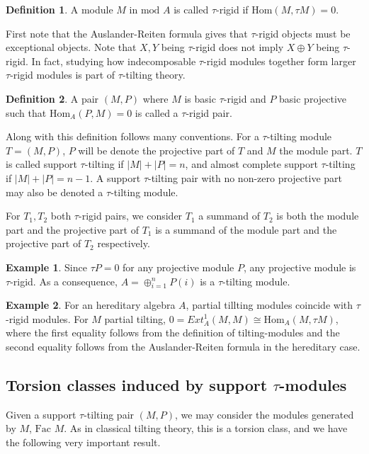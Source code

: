 \documentclass[]{article}
\theoremstyle{definition}
\newtheorem{definition}{Definition}[section]
\newtheorem{example}{Example}[section]
\newcommand{\mo}{\ensuremath{\text{mod }}}
\newcommand{\Hom}{\ensuremath{\text{Hom}}}
\newcommand{\tu}{\ensuremath{\tau}}
\newcommand{\Fac}{\ensuremath{\text{Fac }}}
\begin{document}
\begin{definition}
	A module $M$ in $\mo A$ is called $\tau$-rigid if $\Hom(M,\tau M) = 0$.
\end{definition}

First note that the Auslander-Reiten formula gives that \tu-rigid objects must be exceptional objects. Note that $X,Y$ being $\tau$-rigid does not imply $X \oplus Y$ being $\tau$-rigid. In fact, studying how indecomposable $\tau$-rigid modules together form larger $\tau$-rigid modules is part of $\tau$-tilting theory.

\begin{definition}\cite[Definition 0.3]{tau}
	A pair $(M,P)$ where $M$ is basic $\tau$-rigid and $P$ basic projective such that $\Hom_A(P,M) = 0$ is called a  $\tau$-rigid pair.
\end{definition}

Along with this definition follows many conventions. For a  $\tau$-tilting module $T = (M,P)$, $P$ will be denote the projective part of $T$ and $M$ the module part. $T$ is called support \tu-tilting if $|M| + |P| = n$, and almost complete support \tu-tilting if $|M| + |P| = n - 1$. A support \tu-tilting pair with no non-zero projective part may also be denoted a \tu-tilting module. 

For $T_1,T_2$ both \tu-rigid pairs, we consider $T_1$ a summand of $T_2$ is both the module part and the projective part of $T_1$ is a summand of the module part and the projective part of $T_2$ respectively.

\begin{example}
	Since $\tu P = 0$ for any projective module $P$, any projective module is \tu-rigid. As a consequence, $A = \oplus_{i = 1}^n P(i)$ is a \tu-tilting module.	
\end{example}

\begin{example}
	For an hereditary algebra $A$, partial tillting modules coincide with \tu-rigid modules. For $M$ partial tilting, $0 = Ext^1_A(M,M) \cong \Hom_A(M,\tu M)$, where the first equality follows from the definition of tilting-modules and the second equality follows from the Auslander-Reiten formula in the hereditary case.
\end{example}

\subsection{Torsion classes induced by support \tu-modules}
Given a support \tu-tilting pair $(M,P)$, we may consider the modules generated by $M$, $\Fac M$. As in classical tilting theory, this is a torsion class, and we have the following very important result.
\end{document}
